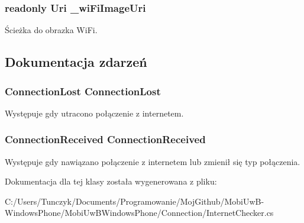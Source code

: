 \subsubsection[{\+\_\+wi\+Fi\+Image\+Uri}]{\setlength{\rightskip}{0pt plus 5cm}readonly Uri \+\_\+wi\+Fi\+Image\+Uri\hspace{0.3cm}{\ttfamily [private]}}\label{a00026_a049c254366c6adc1abf852e1e8fbc170}


Ścieżka do obrazka Wi\+Fi. 



\subsection{Dokumentacja zdarzeń}
\hypertarget{a00026_af8630c0fd32db7cc6a825b183daba148}{}
\subsubsection[{Connection\+Lost}]{\setlength{\rightskip}{0pt plus 5cm}Connection\+Lost Connection\+Lost}\label{a00026_af8630c0fd32db7cc6a825b183daba148}


Występuje gdy utracono połączenie z internetem. 

\hypertarget{a00026_aa0cb318209ac855fa20d6dd536b6eaab}{}
\subsubsection[{Connection\+Received}]{\setlength{\rightskip}{0pt plus 5cm}Connection\+Received Connection\+Received}\label{a00026_aa0cb318209ac855fa20d6dd536b6eaab}


Występuje gdy nawiązano połączenie z internetem lub zmienił się typ połączenia. 



Dokumentacja dla tej klasy została wygenerowana z pliku\+:\begin{DoxyCompactItemize}
\item 
C\+:/\+Users/\+Tunczyk/\+Documents/\+Programowanie/\+Moj\+Github/\+Mobi\+Uw\+B-\/\+Windows\+Phone/\+Mobi\+Uw\+B\+Windows\+Phone/\+Connection/Internet\+Checker.\+cs\end{DoxyCompactItemize}
